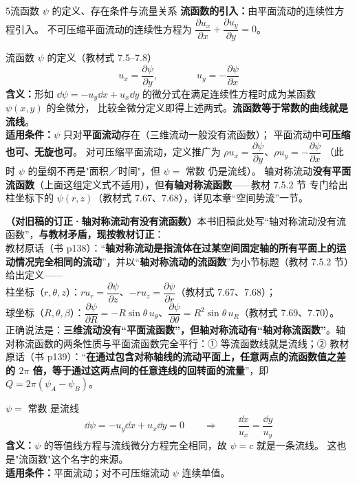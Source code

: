 \begin{kaodian}{5}{流函数 $\psi$ 的定义、存在条件与流量关系}
\textbf{流函数的引入：}由平面流动的连续性方程引入。
不可压缩平面流动的连续性方程为 $\dfrac{\partial u_x}{\partial x}+\dfrac{\partial u_y}{\partial y}=0$。

\begin{gongshi}{流函数 $\psi$ 的定义（教材式 7.5--7.8）}
\[ u_x=\frac{\partial\psi}{\partial y},\qquad\qquad u_y=-\frac{\partial\psi}{\partial x} \]
\textbf{含义：}形如 $\dd\psi=-u_y\dd x+u_x\dd y$ 的微分式在满足连续性方程时成为某函数 $\psi(x,y)$ 的全微分，
比较全微分定义即得上述两式。\textbf{流函数等于常数的曲线就是流线}。\\
\textbf{适用条件：}$\psi$ 只对\textbf{平面流动}存在（三维流动一般没有流函数）；
平面流动中\textbf{可压缩也可、无旋也可}。
对可压缩平面流动，定义推广为 $\rho u_x=\dfrac{\partial\psi}{\partial y}$、$\rho u_y=-\dfrac{\partial\psi}{\partial x}$
（此时 $\psi$ 的量纲不再是"面积／时间"，但 $\psi=$ 常数 仍是流线）。
轴对称流动\textbf{没有平面流函数}（上面这组定义式不适用），但\textbf{有轴对称流函数}——教材 7.5.2 节 专门给出柱坐标下的 $\psi(r,z)$（教材式 7.67、7.68），详见本章“空间势流”一节。
\end{gongshi}

\begin{tishi}
\textbf{（对旧稿的订正·轴对称流动有没有流函数）}本书旧稿此处写“轴对称流动没有流函数”，\textbf{与教材矛盾，现按教材订正}：\\
教材原话（书 p138）：“\textbf{轴对称流动是指流体在过某空间固定轴的所有平面上的运动情况完全相同的流动}”，并以“\textbf{轴对称流动的流函数}”为小节标题（教材 7.5.2 节）给出定义——\\
柱坐标（$r,\theta,z$）：$ru_r=\dfrac{\partial\psi}{\partial z}$、$-ru_z=\dfrac{\partial\psi}{\partial r}$（教材式 7.67、7.68）；\\
球坐标（$R,\theta,\beta$）：$\dfrac{\partial\psi}{\partial R}=-R\sin\theta\,u_\theta$、$\dfrac{\partial\psi}{\partial\theta}=R^2\sin\theta\,u_R$（教材式 7.69、7.70）。\\
正确说法是：\textbf{三维流动没有“平面流函数”，但轴对称流动有“轴对称流函数”}。轴对称流函数的两条性质与平面流函数完全平行：① 等流函数线就是流线；② 教材原话（书 p139）：“\textbf{在通过包含对称轴线的流动平面上，任意两点的流函数值之差的 $2\pi$ 倍，等于通过这两点间的任意连线的回转面的流量}”，即 $Q=2\pi(\psi_A-\psi_B)$。
\end{tishi}

\begin{gongshi}{$\psi=$ 常数 是流线}
\[ \dd\psi=-u_y\dd x+u_x\dd y=0 \qquad\Longrightarrow\qquad \frac{\dd x}{u_x}=\frac{\dd y}{u_y} \]
\textbf{含义：}$\psi$ 的等值线方程与流线微分方程完全相同，故 $\psi=c$ 就是一条流线。
这也是"流函数"这个名字的来源。\\
\textbf{适用条件：}平面流动；对不可压缩流动 $\psi$ 连续单值。
\end{gongshi}


\end{kaodian}
